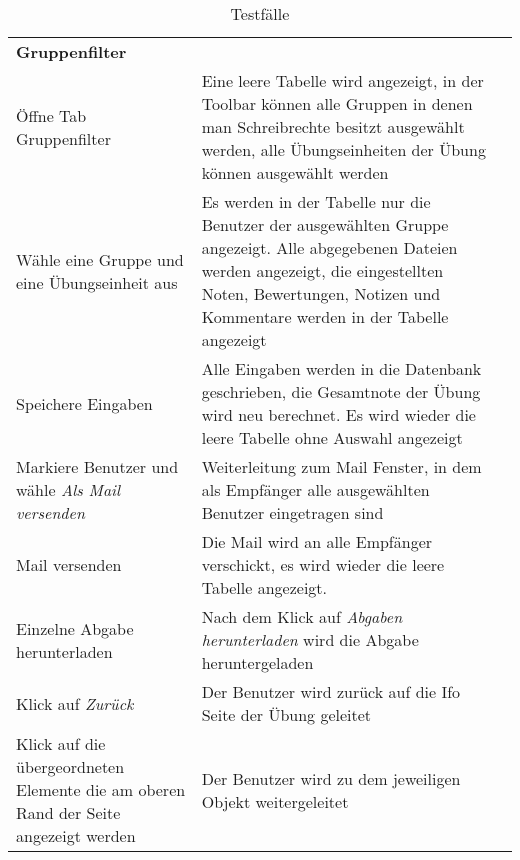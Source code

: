 \begin{table}[]
	\centering
	\caption{Testfälle}
	\label{table4}
	\begin{tabular}{p{6cm}p{7cm}p{3cm}}
			\textbf{Gruppenfilter}  &   &   \\
		    Öffne Tab Gruppenfilter	& Eine leere Tabelle wird angezeigt, in der Toolbar können alle Gruppen in denen man Schreibrechte besitzt ausgewählt werden, alle Übungseinheiten der Übung können ausgewählt werden &\checkmark \\
			Wähle eine Gruppe und eine Übungseinheit aus & Es werden in der Tabelle nur die Benutzer der ausgewählten Gruppe angezeigt. Alle abgegebenen Dateien werden angezeigt, die eingestellten Noten, Bewertungen, Notizen und Kommentare werden in der Tabelle angezeigt &\checkmark \\
			Speichere Eingaben & Alle Eingaben werden in die Datenbank geschrieben, die Gesamtnote der Übung wird neu berechnet. Es wird wieder die leere Tabelle ohne Auswahl angezeigt &\checkmark \\
			Markiere Benutzer und wähle \textit{Als Mail versenden}& Weiterleitung zum Mail Fenster, in dem als Empfänger alle ausgewählten Benutzer eingetragen sind  &\checkmark \\
			Mail versenden & Die Mail wird an alle Empfänger verschickt, es wird wieder die leere Tabelle angezeigt. &\checkmark \\
			Einzelne Abgabe herunterladen & Nach dem Klick auf \textit{Abgaben herunterladen} wird die Abgabe heruntergeladen &\checkmark \\
			Klick auf \textit{Zurück} & Der Benutzer wird zurück auf die Ifo Seite der Übung geleitet &\checkmark \\
			Klick auf die übergeordneten Elemente die am oberen Rand der Seite angezeigt werden & Der Benutzer wird zu dem jeweiligen Objekt weitergeleitet &\checkmark \\
			

	\end{tabular}
\end{table}

